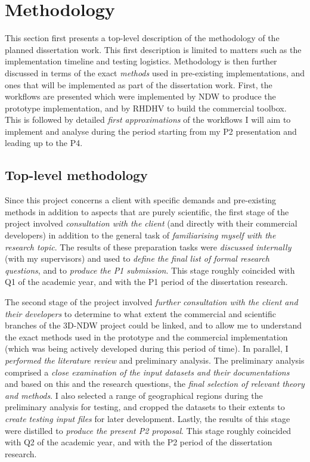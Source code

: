 
\section{Methodology}
\label{sec:m}

This section first presents a top-level description of the methodology of the planned dissertation work. This first description is limited to matters such as the implementation timeline and testing logistics. Methodology is then further discussed in terms of the exact \textit{methods} used in pre-existing implementations, and ones that will be implemented as part of the dissertation work. First, the workflows are presented which were implemented by NDW to produce the prototype implementation, and by RHDHV to build the commercial toolbox. This is followed by detailed \textit{first approximations} of the workflows I will aim to implement and analyse during the period starting from my P2 presentation and leading up to the P4.

\subsection{Top-level methodology}
\label{sub:topmethods}

Since this project concerns a client with specific demands and pre-existing methods in addition to aspects that are purely scientific, the first stage of the project involved \textit{consultation with the client} (and directly with their commercial developers) in addition to the general task of \textit{familiarising myself with the research topic}. The results of these preparation tasks were \textit{discussed internally} (with my supervisors) and used to \textit{define the final list of formal research questions}, and to \textit{produce the P1 submission}. This stage roughly coincided with Q1 of the academic year, and with the P1 period of the dissertation research.

The second stage of the project involved \textit{further consultation with the client and their developers} to determine to what extent the commercial and scientific branches of the 3D-NDW project could be linked, and to allow me to understand the exact methods used in the prototype and the commercial implementation (which was being actively developed during this period of time). In parallel, I \textit{performed the literature review} and preliminary analysis. The preliminary analysis comprised a \textit{close examination of the input datasets and their documentations} and based on this and the research questions, the \textit{final selection of relevant theory and methods}. I also selected a range of geographical regions during the preliminary analysis for testing, and cropped the datasets to their extents to \textit{create testing input files} for later development. Lastly, the results of this stage were distilled to \textit{produce the present P2 proposal}. This stage roughly coincided with Q2 of the academic year, and with the P2 period of the dissertation research.

